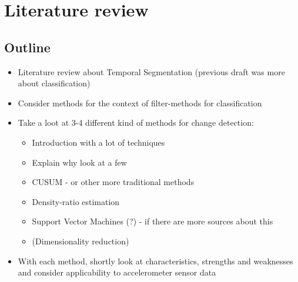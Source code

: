 
\chapter{Literature review}

\label{Chapter2} %


\section{Outline}
\begin{itemize}
  \item Literature review about Temporal Segmentation (previous draft was more about classification)
  \item Consider methods for the context of filter-methods for classification
  \item Take a loot at 3-4 different kind of methods for change detection:
    \begin{itemize}
      \item Introduction with a lot of techniques
      \item Explain why look at a few
      \item CUSUM - or other more traditional methods
      \item Density-ratio estimation
      \item Support Vector Machines (?) - if there are more sources about this
      \item (Dimensionality reduction)
    \end{itemize}
  \item With each method, shortly look at characteristics, strengths and weaknesses and consider applicability to accelerometer sensor data
\end{itemize}



